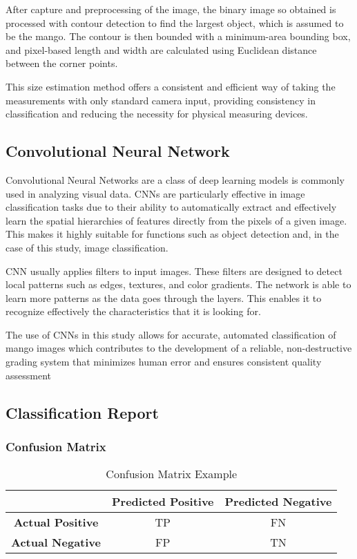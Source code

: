 After capture and preprocessing of the image, the binary image so obtained is
processed with contour detection to find the largest object, which is assumed to
be the mango. The contour is then bounded with a minimum-area bounding box, and
pixel-based length and width are calculated using Euclidean distance between the
corner points.

This size estimation method offers a consistent and efficient way of taking the
measurements with only standard camera input, providing consistency in
classification and reducing the necessity for physical measuring devices.


\subsection{Convolutional Neural Network}
Convolutional Neural Networks are a class of deep learning models is commonly
used in analyzing visual data. CNNs are particularly effective in image
classification tasks due to their ability to automatically extract and
effectively learn the spatial hierarchies of features directly from the pixels
of a given image. This makes it highly suitable for functions such as object
detection and, in the case of this study, image classification.

CNN usually applies filters to input images.  These filters are designed to
detect local patterns such as edges, textures, and color gradients. The network
is able to learn more patterns as the data goes through the layers. This enables
it to recognize effectively the characteristics that it is looking for.

The use of CNNs in this study allows for accurate, automated classification of
mango images which contributes to the development of a reliable, non-destructive
grading system that minimizes human error and ensures consistent quality
assessment


\subsection{Classification Report}

\subsubsection{Confusion Matrix}

\begin{table}[h]
	\centering
	\begin{tabular}{c|c|c}
	\hline
	& \textbf{Predicted Positive} & \textbf{Predicted Negative} \\
	\hline
	\textbf{Actual Positive} & TP & FN \\
	\hline
	\textbf{Actual Negative} & FP & TN \\
	\hline
	\end{tabular}
	\caption{Confusion Matrix Example}
	\label{tab:confusion_matrix}
\end{table}


